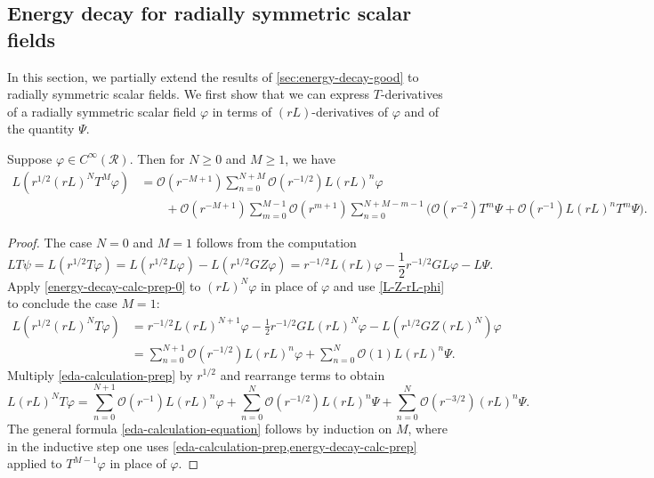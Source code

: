 \documentclass[10pt, reqno]{amsart}
\begin{document}
\subsection{Energy decay for radially symmetric scalar fields}
\label{sec:energy-decay-radially-symmetric} In this section, we partially extend the
results of \cref{sec:energy-decay-good} to radially symmetric scalar fields. We
first show that we can express \(T\)-derivatives of a radially symmetric scalar
field \(\varphi{}\) in terms of \((rL)\)-derivatives of \(\varphi{}\) and of the
quantity \(\Psi{}\).
\begin{lemma}
Suppose \(\varphi{}\in C^\infty(\mathcal{R})\). Then for \(N\ge 0\) and \(M\ge 1\), we have
\begin{equation}\label{eda-calculation-equation}
\begin{split}
L(r^{1/2}(rL)^NT^M\varphi{}) &= \mathcal{O}(r^{-M+1})\sum_{n=0}^{N+M}\mathcal{O}(r^{-1/2})L(rL)^{n}\varphi{}  \\
&\qquad + \mathcal{O}(r^{-M+1})\sum_{m=0}^{M-1}\mathcal{O}(r^{m+1})\sum_{n=0}^{N+M-m-1}\bigl(\mathcal{O}(r^{-2})T^{m}\Psi{} + \mathcal{O}(r^{-1})L(rL)^{n}T^{m}\Psi{}\bigr).
\end{split}
\end{equation}
\label{eda-calculation}
\end{lemma}
\begin{proof}
The case \(N = 0\) and \(M = 1\) follows from the computation
\begin{equation}\label{energy-decay-calc-prep-0}
LT\psi{} = L(r^{1/2}T\varphi{}) = L(r^{1/2}L\varphi{}) - L(r^{1/2}GZ\varphi{}) = r^{-1/2}L(rL)\varphi{} - \frac{1}{2}r^{-1/2}GL\varphi{} - L\Psi{}.
\end{equation}
Apply \cref{energy-decay-calc-prep-0} to \((rL)^N\varphi{}\) in place of \(\varphi{}\) and use
\cref{L-Z-rL-phi} to conclude the case \(M = 1\):
\begin{equation}\label{eda-calculation-prep}
\begin{split}
L(r^{1/2}(rL)^NT\varphi{}) &= r^{-1/2}L(rL)^{N + 1}\varphi{} - \frac{1}{2}r^{-1/2}GL(rL)^N\varphi{} - L(r^{1/2}GZ(rL)^N)\varphi{} \\
&= \sum_{n=0}^{N+1}\mathcal{O}(r^{-1/2})L(rL)^n\varphi{} + \sum_{n=0}^{N} \mathcal{O}(1)L(rL)^n\Psi{}.
\end{split}
\end{equation}
Multiply \cref{eda-calculation-prep} by \(r^{1/2}\) and
rearrange terms to obtain
\begin{equation}\label{energy-decay-calc-prep}
L(rL)^NT\varphi{} = \sum_{n=0}^{N+1}\mathcal{O}(r^{-1})L(rL)^n\varphi{} + \sum_{n=0}^N\mathcal{O}(r^{-1/2})L(rL)^n\Psi{} +  \sum_{n=0}^N\mathcal{O}(r^{-3/2})(rL)^n\Psi{}.
\end{equation}
The general formula \cref{eda-calculation-equation} follows
by induction on \(M\), where in the inductive step one uses
\cref{eda-calculation-prep,energy-decay-calc-prep} applied to
\(T^{M-1}\varphi{}\) in place of \(\varphi{}\).
\end{proof}
\end{document}
